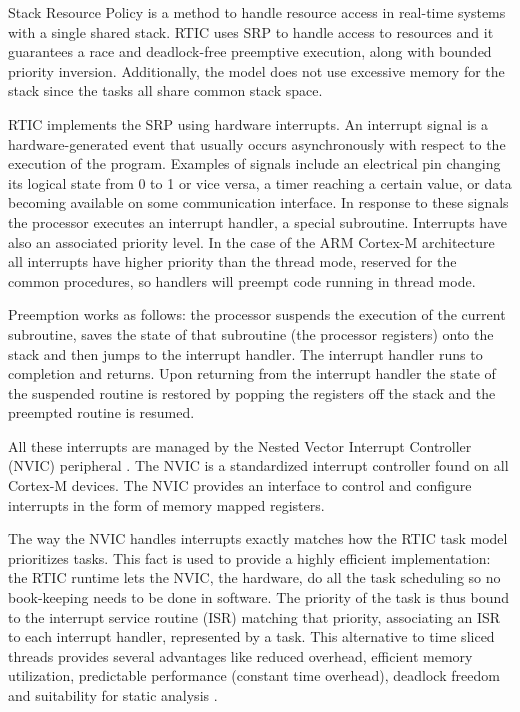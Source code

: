 Stack Resource Policy is a method to handle resource access in real-time systems with a single shared stack. RTIC uses SRP to handle access to resources and it guarantees a race and deadlock-free preemptive execution, along with bounded priority inversion. Additionally, the model does not use excessive memory for the stack since the tasks all share common stack space.

RTIC implements the SRP using hardware interrupts. An interrupt signal is a hardware-generated event that usually occurs asynchronously with respect to the execution of the program. Examples of signals include an electrical pin changing its logical state from 0 to 1 or vice versa, a timer reaching a certain value, or data becoming available on some communication interface. In response to these signals the processor executes an interrupt handler, a special subroutine. Interrupts have also an associated priority level. In the case of the ARM Cortex-M architecture all interrupts have higher priority than the thread mode, reserved for the common procedures, so handlers will preempt code running in thread mode.

Preemption works as follows: the processor suspends the execution of the current subroutine, saves the state of that subroutine (the processor registers) onto the stack and then jumps to the interrupt handler. The interrupt handler runs to completion and returns. Upon returning from the interrupt handler the state of the suspended routine is restored by popping the registers off the stack and the preempted routine is resumed.

All these interrupts are managed by the Nested Vector Interrupt Controller (NVIC) peripheral \cite{definitive-guide-cortex}. The NVIC is a standardized interrupt controller found on all Cortex-M devices. The NVIC provides an interface to control and configure interrupts in the form of memory mapped registers.

The way the NVIC handles interrupts \cite{interrupts-handling} exactly matches how the RTIC task model prioritizes tasks. This fact is used to provide a highly efficient implementation: the RTIC runtime lets the NVIC, the hardware, do all the task scheduling so no book-keeping needs to be done in software. The priority of the task is thus bound to the interrupt service routine (ISR) matching that priority, associating an ISR to each interrupt handler, represented by a task. This alternative to time sliced threads provides several advantages like reduced overhead, efficient memory utilization, predictable performance (constant time overhead), deadlock freedom and suitability for static analysis \cite{rtfm}.

